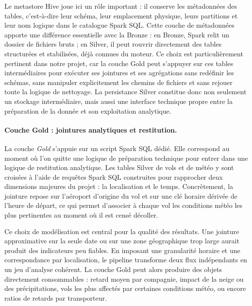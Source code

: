 \documentclass{article}
\begin{document}
Le metastore Hive joue ici un rôle important : il conserve les métadonnées des
tables, c'est-à-dire leur schéma, leur emplacement physique, leurs partitions et
leur nom logique dans le catalogue Spark SQL. Cette couche de métadonnées apporte
une différence essentielle avec la Bronze : en Bronze, Spark relit un dossier de
fichiers bruts ; en Silver, il peut rouvrir directement des tables structurées et
stabilisées, déjà connues du moteur. Ce choix est particulièrement pertinent dans
notre projet, car la couche Gold peut s'appuyer sur ces tables intermédiaires pour
exécuter ses jointures et ses agrégations sans redéfinir les schémas, sans
manipuler explicitement les chemins de fichiers et sans rejouer toute la logique
de nettoyage. La persistance Silver constitue donc non seulement un stockage
intermédiaire, mais aussi une interface technique propre entre la préparation de
la donnée et son exploitation analytique.

\paragraph{Couche Gold : jointures analytiques et restitution.}
La couche \textit{Gold} s'appuie sur un script Spark SQL dédié. Elle correspond au
moment où l'on quitte une logique de préparation technique pour entrer dans une
logique de restitution analytique. Les tables Silver de vols et de météo y sont
croisées à l'aide de requêtes Spark SQL construites pour rapprocher deux dimensions
majeures du projet : la localisation et le temps. Concrètement, la jointure repose
sur l'aéroport d'origine du vol et sur une clé horaire dérivée de l'heure de départ,
ce qui permet d'associer à chaque vol les conditions météo les plus pertinentes au
moment où il est censé décoller.

Ce choix de modélisation est central pour la qualité des résultats. Une jointure
approximative sur la seule date ou sur une zone géographique trop large aurait
produit des indicateurs peu fiables. En imposant une granularité horaire et une
correspondance par localisation, le pipeline transforme deux flux indépendants en un
jeu d'analyse cohérent. La couche Gold peut alors produire des objets directement
consommables : retard moyen par compagnie, impact de la neige ou des précipitations,
vols les plus affectés par certaines conditions météo, ou encore ratios de retards
par transporteur.
\end{document}
